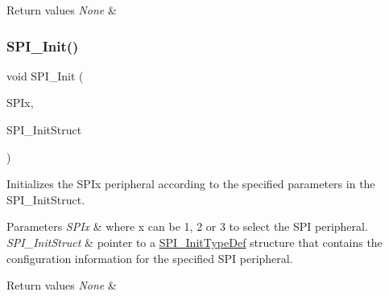 \begin{DoxyRetVals}{Return values}
{\em None} & \\
\hline
\end{DoxyRetVals}
\mbox{\label{group___s_p_i___exported___functions_ga8dacc1dc48bf08c0f12da409f4889037}} 
\subsubsection{\texorpdfstring{SPI\_Init()}{SPI\_Init()}}
{\footnotesize\ttfamily void S\+P\+I\+\_\+\+Init (\begin{DoxyParamCaption}\item[{\mbox{\hyperlink{struct_s_p_i___type_def}{S\+P\+I\+\_\+\+Type\+Def}} $\ast$}]{S\+P\+Ix,  }\item[{\mbox{\hyperlink{struct_s_p_i___init_type_def}{S\+P\+I\+\_\+\+Init\+Type\+Def}} $\ast$}]{S\+P\+I\+\_\+\+Init\+Struct }\end{DoxyParamCaption})}



Initializes the S\+P\+Ix peripheral according to the specified parameters in the S\+P\+I\+\_\+\+Init\+Struct. 


\begin{DoxyParams}{Parameters}
{\em S\+P\+Ix} & where x can be 1, 2 or 3 to select the S\+PI peripheral. \\
\hline
{\em S\+P\+I\+\_\+\+Init\+Struct} & pointer to a \mbox{\hyperlink{struct_s_p_i___init_type_def}{S\+P\+I\+\_\+\+Init\+Type\+Def}} structure that contains the configuration information for the specified S\+PI peripheral. \\
\hline
\end{DoxyParams}

\begin{DoxyRetVals}{Return values}
{\em None} & \\
\hline
\end{DoxyRetVals}
\mbox{\label{group___s_p_i___exported___functions_ga56fc508a482f032f9eb80e4c63184126}} 
